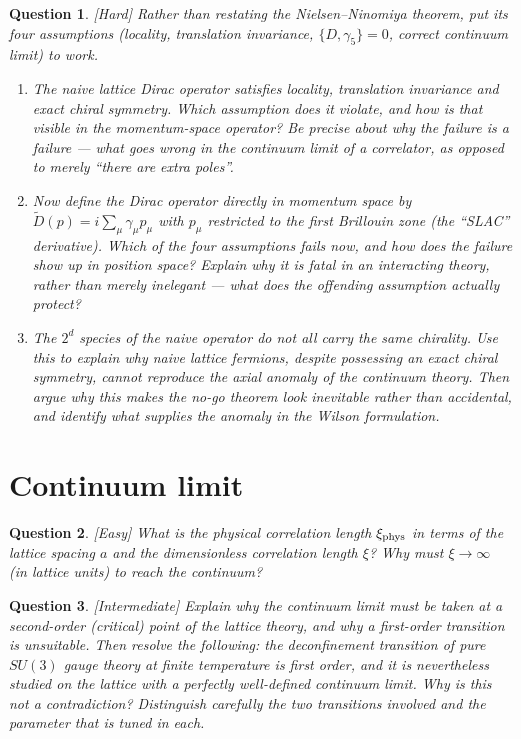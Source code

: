 \documentclass[11pt]{article}
\newcommand{\diff}[1]{\textcolor{blue!60!black}{\footnotesize\textsf{[#1]}}\quad}
\newtheorem{question}{Question}
\begin{document}
\begin{question}
\diff{Hard} Rather than restating the Nielsen--Ninomiya theorem, put its four assumptions (locality, translation invariance, $\{D,\gamma_5\}=0$, correct continuum limit) to work.
\begin{enumerate}[label=(\roman*), leftmargin=*]
  \item The naive lattice Dirac operator satisfies locality, translation invariance and exact chiral symmetry. Which assumption does it violate, and how is that visible in the momentum-space operator? Be precise about \emph{why} the failure is a failure --- what goes wrong in the continuum limit of a correlator, as opposed to merely ``there are extra poles''.
  \item Now define the Dirac operator directly in momentum space by $\tilde D(p) = i\sum_\mu \gamma_\mu p_\mu$ with $p_\mu$ restricted to the first Brillouin zone (the ``SLAC'' derivative). Which of the four assumptions fails now, and how does the failure show up in position space? Explain why it is fatal in an \emph{interacting} theory, rather than merely inelegant --- what does the offending assumption actually protect?
  \item The $2^d$ species of the naive operator do not all carry the same chirality. Use this to explain why naive lattice fermions, despite possessing an exact chiral symmetry, cannot reproduce the axial anomaly of the continuum theory. Then argue why this makes the no-go theorem look inevitable rather than accidental, and identify what supplies the anomaly in the Wilson formulation.
\end{enumerate}
\end{question}

\section{Continuum limit}

\begin{question}
\diff{Easy} What is the physical correlation length $\xi_{\rm phys}$ in terms of the lattice spacing $a$ and the dimensionless correlation length $\xi$? Why must $\xi \to \infty$ (in lattice units) to reach the continuum?
\end{question}

\begin{question}
\diff{Intermediate} Explain why the continuum limit must be taken at a second-order (critical) point of the lattice theory, and why a first-order transition is unsuitable. Then resolve the following: the deconfinement transition of pure $SU(3)$ gauge theory at finite temperature \emph{is} first order, and it is nevertheless studied on the lattice with a perfectly well-defined continuum limit. Why is this not a contradiction? Distinguish carefully the two transitions involved and the parameter that is tuned in each.
\end{question}
\end{document}
